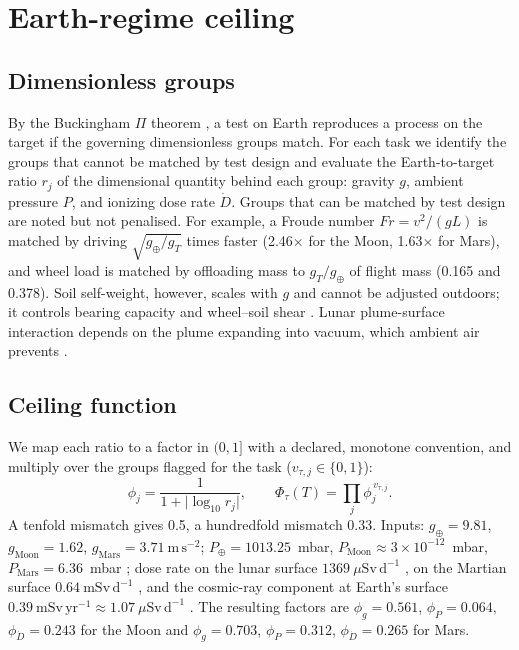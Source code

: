 \documentclass[11pt,a4paper]{article}
\begin{document}
\section{Earth-regime ceiling}

\subsection{Dimensionless groups}
By the Buckingham $\Pi$ theorem \citep{buckingham1914}, a test on Earth reproduces a process on the target if the governing dimensionless groups match. For each task we identify the groups that cannot be matched by test design and evaluate the Earth-to-target ratio $r_j$ of the dimensional quantity behind each group: gravity $g$, ambient pressure $P$, and ionizing dose rate $\dot D$. Groups that can be matched by test design are noted but not penalised. For example, a Froude number $Fr=v^2/(gL)$ is matched by driving $\sqrt{g_\oplus/g_T}$ times faster (2.46$\times$ for the Moon, 1.63$\times$ for Mars), and wheel load is matched by offloading mass to $g_T/g_\oplus$ of flight mass (0.165 and 0.378). Soil self-weight, however, scales with $g$ and cannot be adjusted outdoors; it controls bearing capacity and wheel--soil shear \citep{wong2008,wong2012}. Lunar plume-surface interaction depends on the plume expanding into vacuum, which ambient air prevents \citep{metzger2009}.

\subsection{Ceiling function}
We map each ratio to a factor in $(0,1]$ with a declared, monotone convention, and multiply over the groups flagged for the task ($v_{\tau,j}\in\{0,1\}$):
\begin{equation*}
\phi_j=\frac{1}{1+\lvert\log_{10} r_j\rvert}, \qquad \Phi_\tau(T)=\prod_j \phi_j^{\,v_{\tau,j}}. \tag{11}
\end{equation*}
A tenfold mismatch gives 0.5, a hundredfold mismatch 0.33. Inputs: $g_\oplus=9.81$, $g_{\mathrm{Moon}}=1.62$, $g_{\mathrm{Mars}}=3.71~\mathrm{m\,s^{-2}}$; $P_\oplus=1013.25$~mbar, $P_{\mathrm{Moon}}\approx3\times10^{-12}$~mbar, $P_{\mathrm{Mars}}=6.36$~mbar \citep{nssdc}; dose rate on the lunar surface $1369~\mu\mathrm{Sv\,d^{-1}}$ \citep{zhang2020}, on the Martian surface $0.64~\mathrm{mSv\,d^{-1}}$ \citep{hassler2014}, and the cosmic-ray component at Earth's surface $0.39~\mathrm{mSv\,yr^{-1}}\approx1.07~\mu\mathrm{Sv\,d^{-1}}$ \citep{unscear2008}. The resulting factors are $\phi_g=0.561$, $\phi_P=0.064$, $\phi_{\dot D}=0.243$ for the Moon and $\phi_g=0.703$, $\phi_P=0.312$, $\phi_{\dot D}=0.265$ for Mars.
\end{document}
